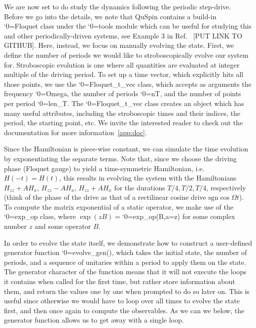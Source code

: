 \documentclass{SciPost}
\newcommand\0{\scalebox{-1}[1]{0}}
\let\svttfamily\ttfamily
\renewcommand\ttfamily{\svttfamily\catcode`0=\active }
\renewcommand\texttt{\bgroup\ttfamily\texttthelp}
\def\texttthelp#1{#1\egroup}
\newcommand{\Spincode}{example9.py}
\begin{document}
We are now set to do study the dynamics following the periodic step-drive. Before we go into the details, we note that QuSpin contains a build-in \texttt{Floquet} class under the \texttt{tools} module which can be useful for studying this and other periodically-driven systems, see Example 3 in Ref.~\cite{weinberg_17_quspin} [PUT LINK TO GITHUB]. Here, instead, we focus on manually evolving the state. First, we define the number of periods we would like to stroboscopically evolve our system for. Stroboscopic evolution is one where all quantities are evaluated at integer multiple of the driving period. To set up a time vector, which explicitly hits all those points, we use the \texttt{Floquet\_t\_vec} class, which accepts as arguments the frequency \texttt{Omega}, the number of periods \texttt{nT}, and the number of points per period \texttt{len\_T}. The \texttt{Floquet\_t\_vec} class creates an object which has many useful attributes, including the stroboscopic times and their indices, the period, the starting point, etc. We invite the interested reader to check out the documentation for more information~\ref{app:doc}.

Since the Hamiltonian is piece-wise constant, we can simulate the time evolution by exponentiating the separate terms. Note that, since we choose the driving phase (Floquet gauge) to yield a time-symmetric Hamiltonian, i.e.~$H(-t)=H(t)$, this results in evolving the system with the Hamiltonians $H_{zz}+AH_x$, $H_{zz}-AH_x$, $H_{zz}+AH_x$ for the durations $T/4,T/2,T/4$, respectively (think of the phase of the drive as that of a rectilinear cosine drive $\mathrm{sgn}\cos\Omega t$). To compute the matrix exponential of a static operator, we make use of the \texttt{exp\_op} class, where $\exp(z B) = $\texttt{exp\_op(B,a=z)} for some complex number $z$ and some operator $B$.

In order to evolve the state itself, we demonstrate how to construct a user-defined generator function \texttt{evolve\_gen()}, which takes the initial state, the number of periods, and a sequence of unitaries within a period to apply them on the state. The generator character of the function means that it will not execute the loops it contains when called for the first time, but rather store information about them, and return the values one by one when prompted to do so later on. This is useful since otherwise we would have to loop over all times to evolve the state first, and then once again to compute the observables. As we can we below, the generator function allows us to get away with a single loop.
\end{document}
